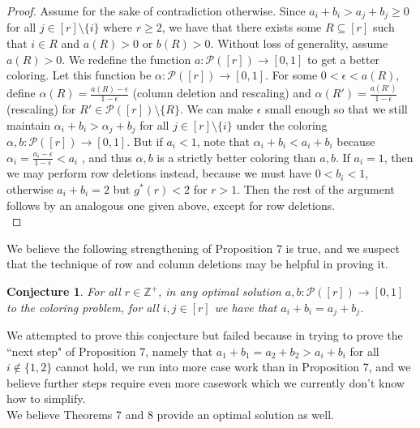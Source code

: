 \documentclass{article}
\newtheorem{conjecture}{Conjecture}
\begin{document}
\begin{proof}
 Assume for the sake of contradiction otherwise. Since $a_i+b_i > a_j+b_j \geq 0$ for all $j \in [r] \setminus \{i\}$ where $r \geq 2$, we have that there exists some $R \subseteq [r]$ such that $i \in R$ and $a(R) > 0$ or $b(R) > 0$. Without loss of generality, assume $a(R) > 0$. We redefine the function $a : \mathcal{P}([r]) \rightarrow [0,1]$ to get a better coloring. Let this function be $\alpha : \mathcal{P}([r]) \rightarrow [0,1]$. For some $0 < \epsilon < a(R)$, define $\alpha(R) = \frac{a(R)-\epsilon}{1-\epsilon}$ (column deletion and rescaling) and $\alpha(R') = \frac{a(R')}{1-\epsilon}$ (rescaling) for $R' \in \mathcal{P}([r]) \setminus \{R\}$. We can make $\epsilon$ small enough so that we still maintain $\alpha_i+b_i > \alpha_j + b_j$ for all $j \in [r] \setminus \{i\}$ under the coloring $\alpha, b : \mathcal{P}([r]) \rightarrow [0,1]$. But if $a_i < 1$, note that $\alpha_i+b_i < a_i + b_i$ because $\alpha_i = \frac{a_i-\epsilon}{1-\epsilon} < a_i$ , and thus $\alpha, b$ is a strictly better coloring than $a,b$. If $a_i = 1$, then we may perform row deletions instead, because we must have $0 < b_i < 1$, otherwise $a_i+b_i = 2$ but $g^*(r) < 2$ for $r > 1$. Then the rest of the argument follows by an analogous one given above, except for row deletions. \\
\end{proof}

We believe the following strengthening of Proposition 7 is true, and we suspect that the technique of row and column deletions may be helpful in proving it. \\

\begin{conjecture}
For all $r \in \mathbb{Z}^{+}$, in any optimal solution $a,b : \mathcal{P}([r]) \rightarrow [0,1]$ to the coloring problem, for all $i,j \in [r]$ we have that $a_i + b_i = a_j + b_j$. 
\end{conjecture}

We attempted to prove this conjecture but failed because in trying to prove the ``next step" of Proposition 7, namely that $a_1+b_1=a_2+b_2 > a_i+b_i$ for all $i \not \in \{1,2\}$ cannot hold, we run into more case work than in Proposition 7, and we believe further steps require even more casework which we currently don't know how to simplify. \\

We believe Theorems 7 and 8 provide an optimal solution as well. \\
\end{document}
